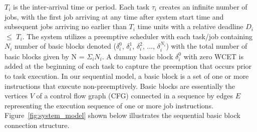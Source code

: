 \begin{math}T_{i}\end{math} is the inter-arrival time or period.  
Each task \begin{math}\tau_{i}\end{math} creates an infinite number of jobs, with the first job arriving at any time after system start time and subsequent jobs arriving no earlier than \begin{math}T_{i}\end{math} time units with a relative deadline \begin{math}D_{i}\end{math} \begin{math}\leq\end{math} \begin{math}T_{i}\end{math}.  The system utilizes a preemptive scheduler with each task/job containing \begin{math}N_{i}\end{math} number of basic blocks denoted (\begin{math}\delta_{i}^{0}\end{math}, \begin{math}\delta_{i}^{1}\end{math}, \begin{math}\delta_{i}^{2}\end{math}, ..., \begin{math}\delta_{i}^{N_{i}}\end{math}) with the total number of basic blocks given by N = \begin{math}\Sigma_{i}\end{math}\begin{math}N_{i}\end{math}. A dummy basic block \begin{math}\delta_{i}^{0}\end{math} with zero WCET is added at the beginning of each task to capture the preemption that occurs prior to task execution.  In our sequential model, a basic block is a set of one or more instructions that execute non-preemptively.  Basic blocks are essentially the vertices $V$ of a control flow graph (CFG) connected in a sequence by edges $E$ representing the execution sequence of one or more job instructions. Figure~\ref{fig:system_model} shown below illustrates the sequential basic block connection structure.
